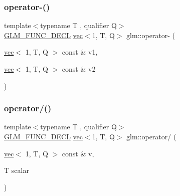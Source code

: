 \subsubsection{\texorpdfstring{operator-\/()}{operator-()}\hspace{0.1cm}{\footnotesize\ttfamily [4/4]}}
{\footnotesize\ttfamily template$<$typename T , qualifier Q$>$ \\
\mbox{\hyperlink{setup_8hpp_ab2d052de21a70539923e9bcbf6e83a51}{G\+L\+M\+\_\+\+F\+U\+N\+C\+\_\+\+D\+E\+CL}} \mbox{\hyperlink{structglm_1_1vec}{vec}}$<$1, T, Q$>$ glm\+::operator-\/ (\begin{DoxyParamCaption}\item[{\mbox{\hyperlink{structglm_1_1vec}{vec}}$<$ 1, T, Q $>$ const \&}]{v1,  }\item[{\mbox{\hyperlink{structglm_1_1vec}{vec}}$<$ 1, T, Q $>$ const \&}]{v2 }\end{DoxyParamCaption})}

\mbox{\label{group__ext__vec1_ga5f0627715e89fde4a13b5655961df660}} 
\subsubsection{\texorpdfstring{operator/()}{operator/()}\hspace{0.1cm}{\footnotesize\ttfamily [1/3]}}
{\footnotesize\ttfamily template$<$typename T , qualifier Q$>$ \\
\mbox{\hyperlink{setup_8hpp_ab2d052de21a70539923e9bcbf6e83a51}{G\+L\+M\+\_\+\+F\+U\+N\+C\+\_\+\+D\+E\+CL}} \mbox{\hyperlink{structglm_1_1vec}{vec}}$<$1, T, Q$>$ glm\+::operator/ (\begin{DoxyParamCaption}\item[{\mbox{\hyperlink{structglm_1_1vec}{vec}}$<$ 1, T, Q $>$ const \&}]{v,  }\item[{T}]{scalar }\end{DoxyParamCaption})}

\mbox{\label{group__ext__vec1_ga851316b0b0cb8d83400d192036a1b128}} 
